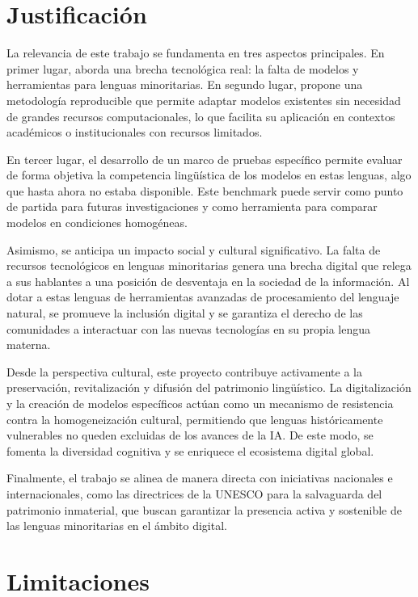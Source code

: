 \section{Justificación}

La relevancia de este trabajo se fundamenta en tres aspectos principales. En primer lugar, aborda una brecha tecnológica real: la falta de modelos y herramientas para lenguas minoritarias. En segundo lugar, propone una metodología reproducible que permite adaptar modelos existentes sin necesidad de grandes recursos computacionales, lo que facilita su aplicación en contextos académicos o institucionales con recursos limitados.

En tercer lugar, el desarrollo de un marco de pruebas específico permite evaluar de forma objetiva la competencia lingüística de los modelos en estas lenguas, algo que hasta ahora no estaba disponible. Este benchmark puede servir como punto de partida para futuras investigaciones y como herramienta para comparar modelos en condiciones homogéneas.

Asimismo, se anticipa un impacto social y cultural significativo. La falta de recursos tecnológicos en lenguas minoritarias genera una brecha digital que relega a sus hablantes a una posición de desventaja en la sociedad de la información. Al dotar a estas lenguas de herramientas avanzadas de procesamiento del lenguaje natural, se promueve la inclusión digital y se garantiza el derecho de las comunidades a interactuar con las nuevas tecnologías en su propia lengua materna.

Desde la perspectiva cultural, este proyecto contribuye activamente a la preservación, revitalización y difusión del patrimonio lingüístico. La digitalización y la creación de modelos específicos actúan como un mecanismo de resistencia contra la homogeneización cultural, permitiendo que lenguas históricamente vulnerables no queden excluidas de los avances de la IA. De este modo, se fomenta la diversidad cognitiva y se enriquece el ecosistema digital global.

Finalmente, el trabajo se alinea de manera directa con iniciativas nacionales e internacionales, como las directrices de la UNESCO para la salvaguarda del patrimonio inmaterial, que buscan garantizar la presencia activa y sostenible de las lenguas minoritarias en el ámbito digital.


\section{Limitaciones}

